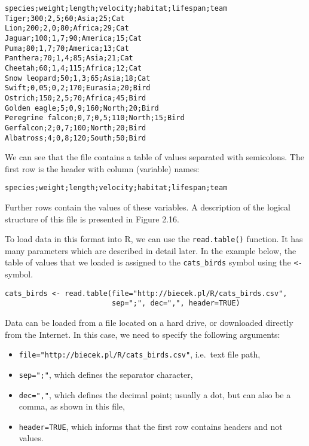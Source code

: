 \documentclass[]{book}
\theoremstyle{definition}
\theoremstyle{definition}
\theoremstyle{definition}
\theoremstyle{remark}
\begin{document}
\begin{verbatim}
species;weight;length;velocity;habitat;lifespan;team
Tiger;300;2,5;60;Asia;25;Cat
Lion;200;2,0;80;Africa;29;Cat
Jaguar;100;1,7;90;America;15;Cat
Puma;80;1,7;70;America;13;Cat
Panthera;70;1,4;85;Asia;21;Cat
Cheetah;60;1,4;115;Africa;12;Cat
Snow leopard;50;1,3;65;Asia;18;Cat
Swift;0,05;0,2;170;Eurasia;20;Bird
Ostrich;150;2,5;70;Africa;45;Bird
Golden eagle;5;0,9;160;North;20;Bird
Peregrine falcon;0,7;0,5;110;North;15;Bird
Gerfalcon;2;0,7;100;North;20;Bird
Albatross;4;0,8;120;South;50;Bird
\end{verbatim}

We can see that the file contains a table of values separated with
semicolons. The first row is the header with column (variable) names:

\begin{verbatim}
species;weight;length;velocity;habitat;lifespan;team
\end{verbatim}

Further rows contain the values of these variables. A description of the
logical structure of this file is presented in Figure 2.16.

To load data in this format into R, we can use the \texttt{read.table()}
function. It has many parameters which are described in detail later. In
the example below, the table of values that we loaded is assigned to the
\texttt{cats\_birds} symbol using the \texttt{\textless{}-} symbol.

\begin{verbatim}
cats_birds <- read.table(file="http://biecek.pl/R/cats_birds.csv",
                         sep=";", dec=",", header=TRUE)
\end{verbatim}

Data can be loaded from a file located on a hard drive, or downloaded
directly from the Internet. In this case, we need to specify the
following arguments:

\begin{itemize}
\item
  \texttt{file="http://biecek.pl/R/cats\_birds.csv"}, i.e.~text file
  path,
\item
  \texttt{sep=";"}, which defines the separator character,
\item
  \texttt{dec=","}, which defines the decimal point; usually a dot, but
  can also be a comma, as shown in this file,
\item
  \texttt{header=TRUE}, which informs that the first row contains
  headers and not values.
\end{itemize}
\end{document}
